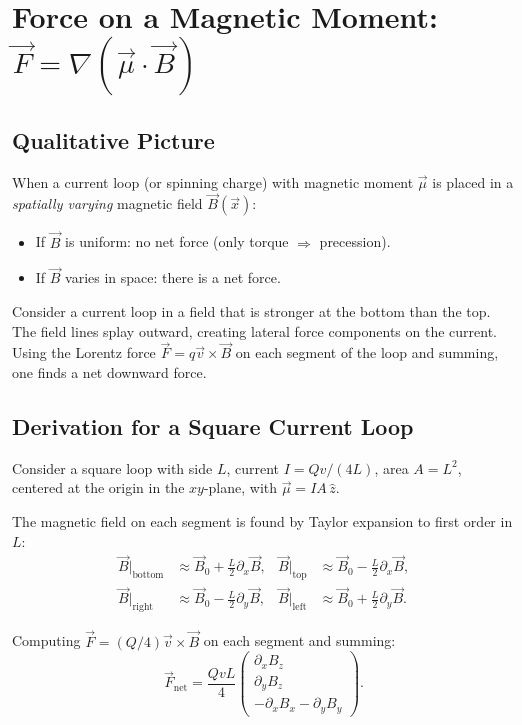 \documentclass[11pt,a4paper]{article}
\theoremstyle{definition}
\theoremstyle{plain}
\theoremstyle{remark}
\begin{document}
\section{Force on a Magnetic Moment: $\vec{F} = \nabla(\vec{\mu}\cdot\vec{B})$}

\subsection{Qualitative Picture}

When a current loop (or spinning charge) with magnetic moment $\vec{\mu}$ is placed in a \emph{spatially varying} magnetic field $\vec{B}(\vec{x})$:
\begin{itemize}
    \item If $\vec{B}$ is uniform: no net force (only torque $\Rightarrow$ precession).
    \item If $\vec{B}$ varies in space: there is a net force.
\end{itemize}

Consider a current loop in a field that is stronger at the bottom than the top. The field lines splay outward, creating lateral force components on the current. Using the Lorentz force $\vec{F} = q\vec{v}\times\vec{B}$ on each segment of the loop and summing, one finds a net downward force.

\subsection{Derivation for a Square Current Loop}

Consider a square loop with side $L$, current $I = Qv/(4L)$, area $A = L^2$, centered at the origin in the $xy$-plane, with $\vec{\mu} = IA\,\hat{z}$.

The magnetic field on each segment is found by Taylor expansion to first order in $L$:
\begin{align}
    \vec{B}\big|_{\text{bottom}} &\approx \vec{B}_0 + \frac{L}{2}\partial_x\vec{B}, &
    \vec{B}\big|_{\text{top}} &\approx \vec{B}_0 - \frac{L}{2}\partial_x\vec{B}, \\
    \vec{B}\big|_{\text{right}} &\approx \vec{B}_0 - \frac{L}{2}\partial_y\vec{B}, &
    \vec{B}\big|_{\text{left}} &\approx \vec{B}_0 + \frac{L}{2}\partial_y\vec{B}.
\end{align}

Computing $\vec{F} = (Q/4)\vec{v}\times\vec{B}$ on each segment and summing:
\[
    \vec{F}_{\text{net}} = \frac{QvL}{4}\begin{pmatrix}\partial_x B_z \\ \partial_y B_z \\ -\partial_x B_x - \partial_y B_y\end{pmatrix}.
\]
\end{document}
